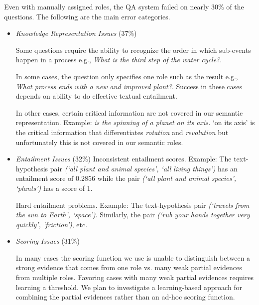Even with manually assigned roles, the QA system failed on nearly 30\% of the questions. The following are the main error categories.
\begin{itemize}
\item {\em Knowledge Representation Issues} (37\%)

Some questions require the ability to recognize the order in which sub-events happen in a process e.g., {\em What is the third step of the water cycle?}.

In some cases, the question only specifies one role such as the result e.g., {\em What process ends with a new and improved plant?}. Success in these cases depends on ability to do effective textual entailment. 

In other cases, certain critical information are not covered in our semantic representation. Example: {\em \underline{\hspace{1cm}} is the spinning of a planet on its axis.} `on its axis' is the critical information that differentiates {\em rotation} and {\em revolution} but unfortunately this is not covered in our semantic roles.
\item {\em Entailment Issues} (32\%)
Inconsistent entailment scores. Example: The text-hypothesis pair {\em(`all plant and animal species', `all living things')} has an entailment score of $0.2856$ while the pair {\em(`all plant and animal species', `plants')} has a score of $1$.

Hard entailment problems. Example: The text-hypothesis pair {\em(`travels from the sun to Earth', `space')}. Similarly, the pair {\em(`rub your hands together very quickly', `friction')}, etc.

\item {\em Scoring Issues} (31\%) 

In many cases the scoring function we use is unable to distinguish between a strong evidence that comes from one role vs. many weak partial evidences from multiple roles. Favoring cases with many weak partial evidences requires learning a threshold.  We plan to investigate a learning-based approach for combining the partial evidences rather than an ad-hoc scoring function. 
\end{itemize}